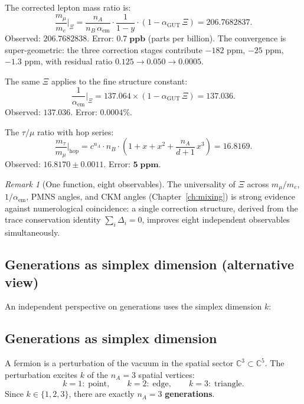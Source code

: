 \documentclass[12pt]{article}
\theoremstyle{remark}
\newtheorem{remark}[theorem]{Remark}
\theoremstyle{definition}
\newcommand{\CC}{\mathbb{C}}
\newcommand{\agut}{\alpha_{\mathrm{GUT}}}
\begin{document}
The corrected lepton mass ratio is:
\begin{equation}
\boxed{\frac{m_\mu}{m_e}\bigg|_{\Xi} = \frac{n_A}{n_B\,\alpha_\mathrm{em}} \cdot \frac{1}{1 - y} \cdot (1 - \agut\,\Xi) = 206.7682837.}
\end{equation}
Observed: $206.7682838$.  Error: $\mathbf{0.7\;\text{ppb}}$ (parts per billion).  The convergence is super-geometric: the three correction stages contribute $-182$ ppm, $-25$ ppm, $-1.3$ ppm, with residual ratio $0.125 \to 0.050 \to 0.0005$.

The same $\Xi$ applies to the fine structure constant:
\begin{equation}
\frac{1}{\alpha_\mathrm{em}}\bigg|_{\Xi} = 137.064 \times (1 - \agut\,\Xi) = 137.036.
\end{equation}
Observed: $137.036$.  Error: $\mathbf{0.0004\%}$.

The $\tau/\mu$ ratio with hop series:
\begin{equation}
\frac{m_\tau}{m_\mu}\bigg|_{\text{hop}} = c^{n_A}\cdot n_B \cdot \left(1 + x + x^2 + \frac{n_A}{d+1}\,x^3\right) = 16.8169.
\end{equation}
Observed: $16.8170 \pm 0.0011$.  Error: $\mathbf{5\;\text{ppm}}$.

\begin{remark}[One function, eight observables]
The universality of $\Xi$ across $m_\mu/m_e$, $1/\alpha_\mathrm{em}$, PMNS angles, and CKM angles (Chapter~\ref{ch:mixing}) is strong evidence against numerological coincidence: a single correction structure, derived from the trace conservation identity $\sum_i \Delta_i = 0$, improves eight independent observables simultaneously.
\end{remark}

\subsection{Generations as simplex dimension (alternative view)}
\label{sec:gen_alt}

An independent perspective on generations uses the simplex dimension $k$:

\subsection{Generations as simplex dimension}

A fermion is a perturbation of the vacuum in the spatial sector $\CC^3 \subset \CC^5$. The perturbation excites $k$ of the $n_A = 3$ spatial vertices:
\begin{equation}
k = 1:\;\text{point}, \qquad k = 2:\;\text{edge}, \qquad k = 3:\;\text{triangle}.
\end{equation}
Since $k \in \{1, 2, 3\}$, there are exactly $n_A = 3$ \textbf{generations}.
\end{document}
